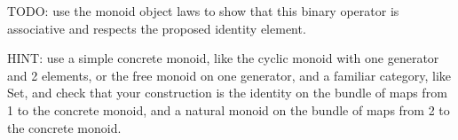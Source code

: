 \documentclass[14pt]{article}
\begin{document}







TODO: use the monoid object laws to show that this binary operator is associative and respects the proposed identity element.

HINT: use a simple concrete monoid, like the cyclic monoid with one generator and 2 elements, or the free monoid on one generator, and a familiar category, like Set,
and check that your construction is the identity on the bundle of maps from 1 to the concrete monoid, and a
natural monoid on the bundle of maps from 2 to the concrete monoid.
\end{document}
